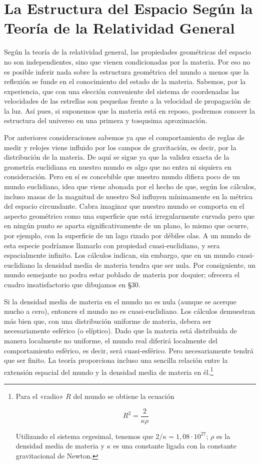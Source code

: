\documentclass[spanish]{book}
\begin{document}
\chapter{La Estructura del Espacio Según la Teoría de la Relatividad General}

Según la teoría de la relatividad general, las propiedades geométricas del espacio no
son independientes, sino que vienen condicionadas por la materia. Por eso no es
posible inferir nada sobre la estructura geométrica del mundo a menos que la
reflexión se funde en el conocimiento del estado de la materia. Sabemos, por la
experiencia, que con una elección conveniente del sistema de coordenadas las
velocidades de las estrellas son pequeñas frente a la velocidad de propagación de la
luz. Así pues, si suponemos que la materia está en reposo, podremos conocer la
estructura del universo en una primera y tosqusima aproximación.

Por anteriores consideraciones sabemos ya que el comportamiento de reglas de medir
y relojes viene influido por los campos de gravitación, es decir, por la distribución de
la materia. De aquí se sigue ya que la validez exacta de la geometría euclidiana en
nuestro mundo es algo que no entra ni siquiera en consideración. Pero en sí es
concebible que nuestro mundo difiera poco de un mundo euclidiano, idea que viene
abonada por el hecho de que, según los cálculos, incluso masas de la magnitud de
nuestro Sol influyen mínimamente en la métrica del espacio circundante. Cabra
imaginar que nuestro mundo se comporta en el aspecto geométrico como una
superficie que está irregularmente curvada pero que en ningún punto se aparta
significativamente de un plano, lo mismo que ocurre, por ejemplo, con la superficie
de un lago rizado por débiles olas. A un mundo de esta especie podríamos llamarlo
con propiedad cuasi-euclidiano, y sera espacialmente infinito. Los cálculos indican, sin
embargo, que en un mundo cuasi-euclidiano la densidad media de materia tendra que
ser nula. Por consiguiente, un mundo semejante no podra estar poblado de materia
por doquier; ofrecera el cuadro insatisfactorio que dibujamos en \S 30.

Si la densidad media de materia en el mundo no es nula (aunque se acerque mucho
a cero), entonces el mundo no es cuasi-euclidiano. Los cálculos demuestran más
bien que, con una distribución uniforme de materia, debera ser necesariamente
esférico (o elíptico). Dado que la materia está distribuida de manera localmente no
uniforme, el mundo real diferirá localmente del comportamiento esférico, es
decir, será cuasi-esférico. Pero necesariamente tendrá que ser finito. La teoría
proporciona incluso una sencilla relación entre la extensión espacial del mundo y la
densidad media de materia en él.\footnote{Para el «radio» $R$ del mundo se obtiene la
ecuación

\[R^{2}=\frac{2}{\kappa \rho}\]

Utilizando el sistema cegesimal, tenemos que $2/\kappa=1,08\cdot10^{27}$;
$\rho$ es la densidad media de materia y $\kappa$ es una constante ligada con la constante
gravitacional de Newton.}
\end{document}
